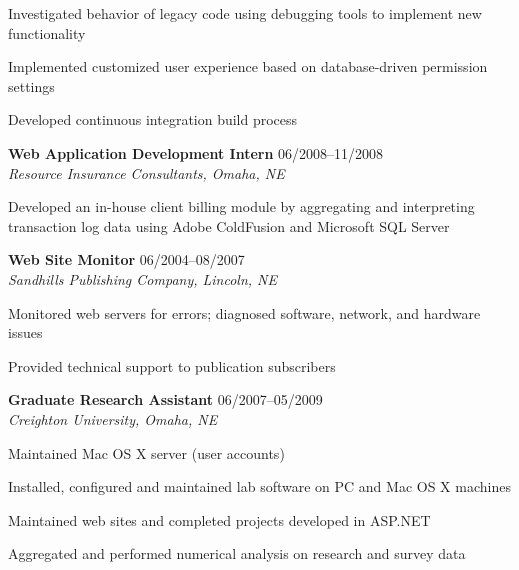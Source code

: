 \begin{itemize1}
\begin{itemize1}
 			\item Investigated behavior of legacy code using debugging tools to implement new functionality	
			\item Implemented customized user experience based on database-driven permission settings
			\item Developed continuous integration build process
		\end{itemize1}
	\item \textbf{Web Application Development Intern} \textopenbullet{} 06/2008--11/2008 \\
		\textit{Resource Insurance Consultants, Omaha, NE} \vspace{-1.5mm}
		\begin{itemize1}
			\item Developed an in-house client billing module by aggregating and interpreting transaction log data using Adobe ColdFusion and Microsoft SQL Server			
		\end{itemize1}
	\item \textbf{Web Site Monitor} \textopenbullet{} 06/2004--08/2007 \\
		\textit{Sandhills Publishing Company, Lincoln, NE} \vspace{-1.5mm}
		\begin{itemize1}
			\item Monitored web servers for errors; diagnosed software, network, and hardware issues
			\item Provided technical support to publication subscribers
		\end{itemize1}
	\item \textbf{Graduate Research Assistant} \textopenbullet{} 06/2007--05/2009 \\
		\textit{Creighton University, Omaha, NE} \vspace{-1.5mm}
		\begin{itemize1}
			\item Maintained Mac OS X server (user accounts)
			\item Installed, configured and maintained lab software on PC and Mac OS X machines
			\item Maintained web sites and completed projects developed in ASP.NET
			\item Aggregated and performed numerical analysis on research and survey data
		\end{itemize1}

\end{itemize1}

